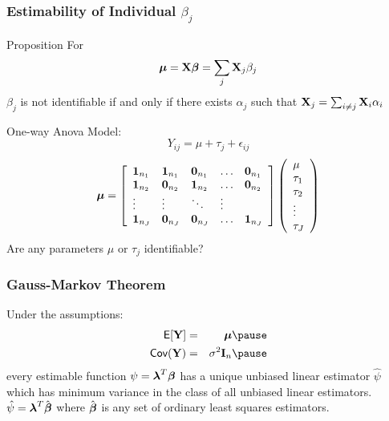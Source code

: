 \documentclass[handout]{beamer}\usepackage[]{graphicx}\usepackage[]{color}
\begin{document}
\begin{frame}
  \frametitle{Estimability of Individual $\beta_j$}
  \begin{block}{Proposition}
For    $$\boldsymbol{\mu} = \mathbf{X} \boldsymbol{\beta} = \sum_j \mathbf{X}_j \beta_j$$
$\beta_j$ is not identifiable  if and only if there exists $\alpha_j$
such that $\mathbf{X}_j = \sum_{i \neq j} \mathbf{X}_i \alpha_i$
  \end{block} \pause
One-way Anova Model:
$$Y_{ij} = \mu + \tau_j + \epsilon_{ij}$$
  $$ \boldsymbol{\mu} =  \left[
    \begin{array}{lllll}
\mathbf{1}_{n_1} & \mathbf{1}_{n_1} & \mathbf{0}_{n_1} &  \ldots & \mathbf{0}_{n_1} \\
\mathbf{1}_{n_2} & \mathbf{0}_{n_2} & \mathbf{1}_{n_2} &  \ldots & \mathbf{0}_{n_2} \\
\vdots & \vdots & \ddots & \vdots \\
\mathbf{1}_{n_J} & \mathbf{0}_{n_J} & \mathbf{0}_{n_J} &  \ldots & \mathbf{1}_{n_J} \\
    \end{array} \right]
 \left(   \begin{array}{l}
      \mu \\
      \tau_1 \\
   \tau_2 \\
 \vdots \\
\tau_J
    \end{array} \right)
$$\pause
Are any parameters $\mu$ or $\tau_j$ identifiable?
\end{frame}

\begin{frame}
  \frametitle{Gauss-Markov Theorem}
  \begin{theorem}

  Under the assumptions:
  \begin{eqnarray*}
    \E[\Y] & = & \mub \pause \\
    \Cov(\Y) & = &\sigma^2 \I_n \pause
  \end{eqnarray*}
every estimable function $\psi = \boldsymbol{\lambda}^T\boldsymbol{\beta}$ has a unique unbiased
linear estimator $\hat{\psi}$ which has minimum variance in the class
of all unbiased linear estimators. \pause  $\hat{\psi} = \boldsymbol{\lambda}^T\hat{\boldsymbol{\beta}}$
where $\hat{\boldsymbol{\beta}}$ is any set of ordinary least squares
estimators.

  \end{theorem}
\end{frame}
\end{document}
